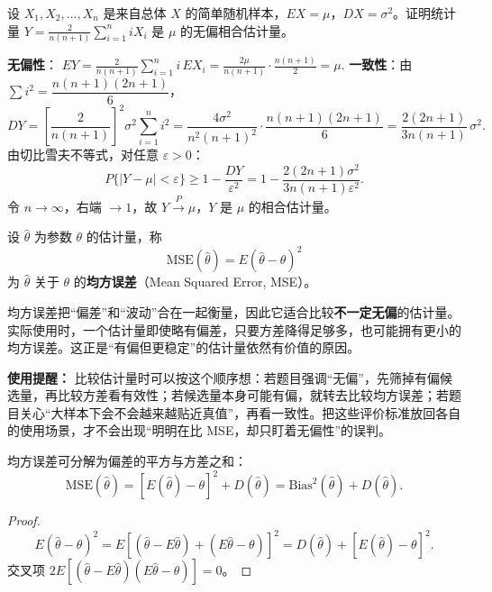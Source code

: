 \documentclass[lang=cn,11pt]{elegantbook}
\begin{document}
\begin{exercise}\label{exer:7-consistent}
设 \(X_1, X_2, \dots, X_n\) 是来自总体 \(X\) 的简单随机样本，\(EX = \mu\)，\(DX = \sigma^2\)。证明统计量
\(
Y = \frac{2}{n(n+1)}\sum_{i=1}^{n}iX_i
\)
是 \(\mu\) 的无偏相合估计量。
\end{exercise}
\begin{solution}
\textbf{无偏性}：
\(
EY = \frac{2}{n(n+1)}\sum_{i=1}^{n}i\,EX_i = \frac{2\mu}{n(n+1)}\cdot\frac{n(n+1)}{2} = \mu.
\)
\textbf{一致性}：由 \(\sum i^2 = \dfrac{n(n+1)(2n+1)}{6}\)，
\[
DY = \left[\frac{2}{n(n+1)}\right]^{\!2}\sigma^2\sum_{i=1}^{n}i^2 = \frac{4\sigma^2}{n^2(n+1)^2}\cdot\frac{n(n+1)(2n+1)}{6} = \frac{2(2n+1)}{3n(n+1)}\,\sigma^2.
\]
由切比雪夫不等式，对任意 \(\varepsilon > 0\)：
\[
P\{|Y-\mu| < \varepsilon\} \geq 1 - \frac{DY}{\varepsilon^2} = 1 - \frac{2(2n+1)\sigma^2}{3n(n+1)\varepsilon^2}.
\]
令 \(n\to\infty\)，右端 \(\to 1\)，故 \(Y\xrightarrow{P}\mu\)，\(Y\) 是 \(\mu\) 的相合估计量。
\end{solution}



\begin{definition}[均方误差] \label{def:mse}
设 \(\hat{\theta}\) 为参数 \(\theta\) 的估计量，称
\[
\mathrm{MSE}(\hat{\theta}) = E(\hat{\theta} - \theta)^2
\]
为 \(\hat{\theta}\) 关于 \(\theta\) 的\textbf{均方误差}（Mean Squared Error, MSE）。
\end{definition}

\begin{note}
均方误差把“偏差”和“波动”合在一起衡量，因此它适合比较\textbf{不一定无偏}的估计量。实际使用时，一个估计量即使略有偏差，只要方差降得足够多，也可能拥有更小的均方误差。这正是“有偏但更稳定”的估计量依然有价值的原因。
\end{note}

\begin{note}
\textbf{使用提醒：} 比较估计量时可以按这个顺序想：若题目强调“无偏”，先筛掉有偏候选量，再比较方差看有效性；若候选量本身可能有偏，就转去比较均方误差；若题目关心“大样本下会不会越来越贴近真值”，再看一致性。把这些评价标准放回各自的使用场景，才不会出现“明明在比 MSE，却只盯着无偏性”的误判。
\end{note}

\begin{property}[均方误差的分解] \label{prop:mse-decomp}
均方误差可分解为偏差的平方与方差之和：
\[
\mathrm{MSE}(\hat{\theta}) = [E(\hat{\theta}) - \theta]^2 + D(\hat{\theta}) = \mathrm{Bias}^2(\hat{\theta}) + D(\hat{\theta}).
\]
\begin{proof}
\[
E(\hat{\theta}-\theta)^2 = E\!\left[(\hat{\theta}-E\hat{\theta})+(E\hat{\theta}-\theta)\right]^2 = D(\hat{\theta}) + [E(\hat{\theta})-\theta]^2.
\]
交叉项 \(2E[(\hat{\theta}-E\hat{\theta})(E\hat{\theta}-\theta)] = 0\)。
\end{proof}
\end{property}
\end{document}
